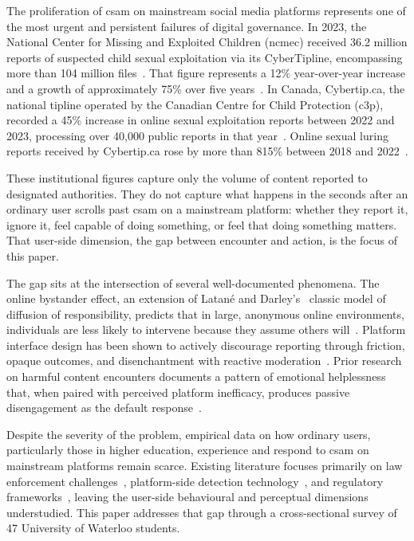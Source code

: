 \documentclass{ieee-portfolio}
\begin{document}
The proliferation of \gls{csam} on mainstream social media platforms represents one of the most urgent and persistent failures of digital governance. In 2023, the National Center for Missing and Exploited Children (\gls{ncmec}) received 36.2 million reports of suspected child sexual exploitation via its CyberTipline, encompassing more than 104 million files~\cite{ncmec_2023}. That figure represents a 12\% year-over-year increase and a growth of approximately 75\% over five years~\cite{dhs_2024}. In Canada, Cybertip.ca, the national tipline operated by the Canadian Centre for Child Protection (\gls{c3p}), recorded a 45\% increase in online sexual exploitation reports between 2022 and 2023, processing over 40,000 public reports in that year~\cite{cybertip_2023}. Online sexual luring reports received by Cybertip.ca rose by more than 815\% between 2018 and 2022~\cite{c3p_2023}.
 
These institutional figures capture only the volume of content reported to designated authorities. They do not capture what happens in the seconds after an ordinary user scrolls past \gls{csam} on a mainstream platform: whether they report it, ignore it, feel capable of doing something, or feel that doing something matters. That user-side dimension, the gap between encounter and action, is the focus of this paper.
 
The gap sits at the intersection of several well-documented phenomena. The online bystander effect, an extension of Latané and Darley's~\cite{latane_unresponsive_1970} classic model of diffusion of responsibility, predicts that in large, anonymous online environments, individuals are less likely to intervene because they assume others will~\cite{herry_gender_2022,jeyagobi_factors_2022}. Platform interface design has been shown to actively discourage reporting through friction, opaque outcomes, and disenchantment with reactive moderation~\cite{wong_combating_2016,huang_severity_2023}. Prior research on harmful content encounters documents a pattern of emotional helplessness that, when paired with perceived platform inefficacy, produces passive disengagement as the default response~\cite{jeyagobi_factors_2022,seligman_helplessness_1975}.
 
Despite the severity of the problem, empirical data on how ordinary users, particularly those in higher education, experience and respond to \gls{csam} on mainstream platforms remain scarce. Existing literature focuses primarily on law enforcement challenges~\cite{aic_2022}, platform-side detection technology~\cite{ncmec_2023}, and regulatory frameworks~\cite{us_protecting_2023,gc_c63_2024}, leaving the user-side behavioural and perceptual dimensions understudied. This paper addresses that gap through a cross-sectional survey of 47 University of Waterloo students.
 
\end{document}

